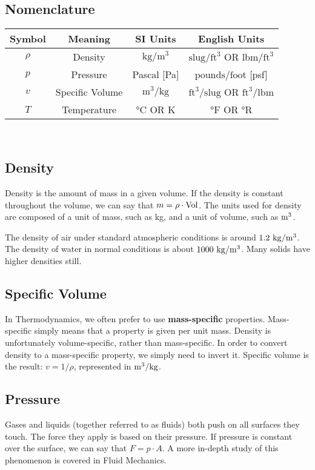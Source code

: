 \subsection{Nomenclature}
\begin{tabular}{cccc}
  Symbol & Meaning & SI Units & English Units \\ \hline 
  $\rho$ & Density & $\text{kg}/\text{m}^3$ & $\text{slug}/\text{ft}^3$ OR $\text{lbm}/\text{ft}^3$ \\
  $p$ & Pressure & Pascal [Pa] & $\text{pounds}/\text{foot}$ [psf] \\
  $v$ & Specific Volume & $\text{m}^3/\text{kg}$ & $\text{ft}^3/\text{slug}$ OR $\text{ft}^3/\text{lbm}$ \\
  $T$ & Temperature & °C OR K & °F OR °R
\end{tabular}\\
\subsection{Density}
Density is the amount of mass in a given volume.  If the density is constant throughout the volume, we can say that $m = \rho \cdot {\rm Vol}$.  The units used for density are composed of a unit of mass, such as kg, and a unit of volume, such as $\rm m^3$.

The density of air under standard atmospheric conditions is around $1.2\ {\rm kg/m^3}$.  The density of water in normal conditions is about $1000\ {\rm kg/m^3}$.  Many solids have higher densities still.

\subsection{Specific Volume}
In Thermodynamics, we often prefer to use {\bf mass-specific} properties.  Mass-specific simply means that a property is given per unit mass.  Density is unfortunately volume-specific, rather than mass-specific.  In order to convert density to a mass-specific property, we simply need to invert it.  Specific volume is the result: $v = 1/\rho$, represented in $\rm m^3/kg$.

\subsection{Pressure}
Gases and liquids (together referred to as fluids) both push on all surfaces they touch.  The force they apply is based on their pressure.  If pressure is constant over the surface, we can say that $F = p\cdot A$.  A more in-depth study of this phenomenon is covered in Fluid Mechanics.

